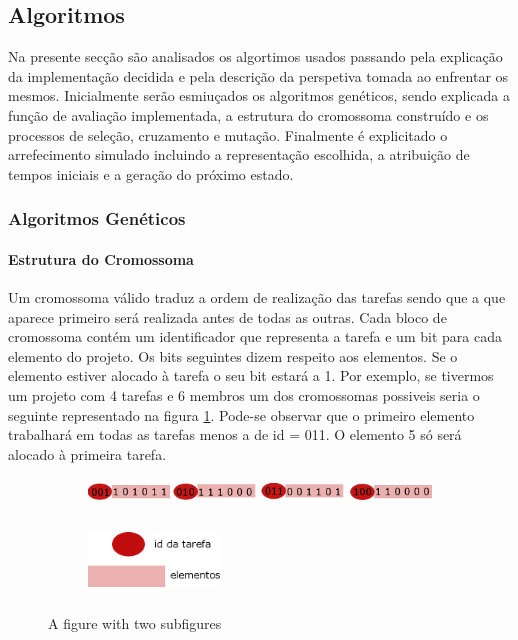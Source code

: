 \begin{titlepage}
\subsection{Algoritmos}
\justify\normalsize

Na presente secção são analisados os algortimos usados passando pela explicação da implementação decidida e pela descrição da perspetiva tomada ao enfrentar os mesmos. Inicialmente serão esmiuçados os algoritmos genéticos, sendo explicada a função de avaliação implementada, a estrutura do cromossoma construído e os processos de seleção, cruzamento e mutação. Finalmente é explicitado o arrefecimento simulado incluindo a representação escolhida, a atribuição de tempos iniciais e a geração do próximo estado. 


\subsubsection{Algoritmos Genéticos}

\paragraph{Estrutura do Cromossoma}
\justify\normalsize
Um cromossoma válido traduz a ordem de realização das tarefas sendo que a que aparece primeiro será realizada antes de todas as outras. Cada bloco de cromossoma contém um identificador que representa a tarefa e um bit para cada elemento do projeto. Os bits seguintes dizem respeito aos elementos. Se o elemento estiver alocado à tarefa o seu bit estará a 1. Por exemplo, se tivermos um projeto com 4 tarefas e 6 membros um dos cromossomas possiveis seria o seguinte representado na figura \ref{fig:sub1}. Pode-se observar que o primeiro elemento trabalhará em todas as tarefas menos a de id = 011. O elemento 5 só será alocado à primeira tarefa.

\begin{figure}[h!]
\centering
\begin{subfigure}{.6\textwidth}
  \centering
  \includegraphics[width=14cm, height = 0.7cm]{chromosome.png}
  \label{fig:sub1}
\end{subfigure}%
\begin{subfigure}{.7\textwidth}
  \centering
  \includegraphics[width=3.5cm, height =1.9cm]{legenda.png}
  \label{fig:sub2}
\end{subfigure}
\caption{A figure with two subfigures}
\label{fig:test}
\end{figure}


\end{titlepage}

